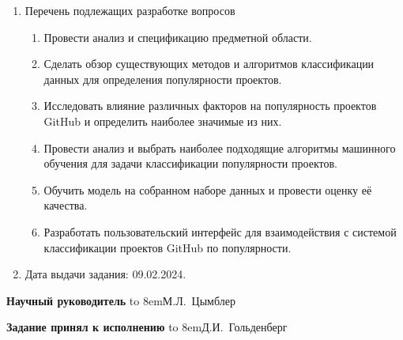 \begin{adjustwidth}{-1.5cm}{0.5cm}
\begin{linespread}{1}
{\begin{enumerate}
	\bf\item Перечень подлежащих разработке вопросов\rm
	\begin{enumerate}
		\item Провести анализ и спецификацию предметной области.
        \item Сделать обзор существующих методов и алгоритмов классификации данных для определения популярности проектов.
        \item Исследовать влияние различных факторов на популярность проектов GitHub и определить наиболее значимые из них.
        \item Провести анализ и выбрать наиболее подходящие алгоритмы машинного обучения для задачи классификации популярности проектов.
        \item Обучить модель на собранном наборе данных и провести оценку её качества.
        \item Разработать пользовательский интерфейс для взаимодействия с системой классификации проектов GitHub по популярности.
	\end{enumerate}

	\bf\item Дата выдачи задания: \rm
	09.02.2024.
\end{enumerate}

\vspace{1em}

\noindent
\textbf{Научный руководитель}
\hfill
\hbox to 8em{М.Л.~Цымблер\hfill}

\vspace{1em}

\noindent
\textbf{Задание принял к исполнению}
\hfill
\hbox to 8em{Д.И.~Гольденберг\hfill}

}

\thispagestyle{empty}

\end{linespread}
\end{adjustwidth}

\pagebreak
